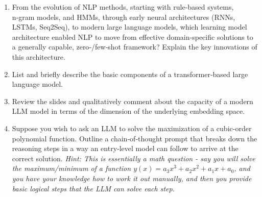 \documentclass[12pt]{article}
\begin{document}
\begin{enumerate}
  \item From the evolution of NLP methods, starting with rule‑based systems, n‑gram models, and HMMs, through early neural architectures (RNNs, LSTMs, Seq2Seq), to modern large language models, which learning model architecture enabled NLP to move from effective domain‑specific solutions to a generally capable, zero‑/few‑shot framework? Explain the key innovations of this architecture.
  
  \item List and briefly describe the basic components of a transformer‑based large language model. 

  \item Review the slides and qualitatively comment about the capacity of a modern LLM model in terms of the dimension of the underlying embedding space. 
  
  \item Suppose you wish to ask an LLM to solve the maximization of a cubic-order polynomial function. Outline a chain‑of‑thought prompt that breaks down the reasoning steps in a way an entry‑level model can follow to arrive at the correct solution. \textit{Hint: This is essentially a math question - say you will solve the maximum/minimum of a function $y(x) = a_3 x^3 + a_2 x^2 + a_1 x + a_0$, and you have your knowledge how to work it out manually, and then you provide basic logical steps that the LLM can solve each step.}
\end{enumerate}

\newpage 
\section*{}
\end{document}
